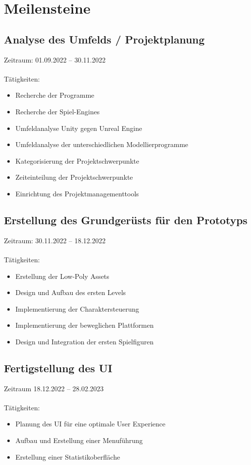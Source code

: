 \pagebreak

\section{Meilensteine}
\subsection{Analyse des Umfelds / Projektplanung}
Zeitraum: 01.09.2022 – 30.11.2022\\\\
Tätigkeiten:
\begin{itemize}
    \item Recherche der Programme
    \item Recherche der Spiel-Engines
    \item Umfeldanalyse Unity gegen Unreal Engine
    \item Umfeldanalyse der unterschiedlichen Modellierprogramme
    \item Kategorisierung der Projektschwerpunkte
    \item Zeiteinteilung der Projektschwerpunkte
    \item Einrichtung des Projektmanagementtools 
\end{itemize}

\subsection{Erstellung des Grundgerüsts für den Prototyps}
Zeitraum: 30.11.2022 – 18.12.2022\\\\
Tätigkeiten:
\begin{itemize}
    \item Erstellung der Low-Poly Assets
    \item Design und Aufbau des ersten Levels 
    \item Implementierung der Charaktersteuerung
    \item Implementierung der beweglichen Plattformen
    \item Design und Integration der ersten Spielfiguren
\end{itemize}
\pagebreak

\subsection{Fertigstellung des UI}
Zeitraum 18.12.2022 – 28.02.2023\\\\
Tätigkeiten:
\begin{itemize}
    \item Planung des UI für eine optimale User Experience
    \item Aufbau und Erstellung einer Menuführung
    \item Erstellung einer Statistikoberfläche
\end{itemize}

